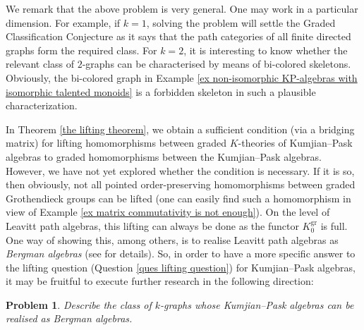 \documentclass[12pt]{amsart}
\newtheorem{prob}[thm]{Problem}
\theoremstyle{definition}
\theoremstyle{remark}
\newcommand{\gr}{\operatorname{gr}}
\begin{document}
We remark that the above problem is very general. One may work in a particular dimension. For example, if $k=1$, solving the problem will settle the Graded Classification Conjecture as it says that the path categories of all finite directed graphs form the required class. For $k=2$, it is interesting to know whether the relevant class of $2$-graphs can be characterised by means of bi-colored skeletons. Obviously, the bi-colored graph in Example \ref{ex non-isomorphic KP-algebras with isomorphic talented monoids} is a forbidden skeleton in such a plausible characterization.  


In Theorem \ref{the lifting theorem}, we obtain a sufficient condition (via a bridging matrix) for lifting homomorphisms between graded $K$-theories of Kumjian--Pask algebras to graded homomorphisms between the Kumjian--Pask algebras. However, we have not yet explored whether the condition is necessary. If it is so, then obviously, not all pointed order-preserving homomorphisms between graded Grothendieck groups can be lifted (one can easily find such a homomorphism in view of Example \ref{ex matrix commutativity is not enough}). On the level of Leavitt path algebras, this lifting can always be done as the functor $K_0^{\gr}$ is full. One way of showing this, among others, is to realise Leavitt path algebras as \emph{Bergman algebras} (see \cite{HLR} for details). So, in order to have a more specific answer to the lifting question (Question \ref{ques lifting question}) for Kumjian--Pask algebras, it may be fruitful to execute further research in the following direction: 
\begin{prob}\label{prob For which k-graphs KP-algebras are Bergman algebras}
Describe the class of $k$-graphs whose Kumjian--Pask algebras can be realised as Bergman algebras. 
\end{prob}
\end{document}

